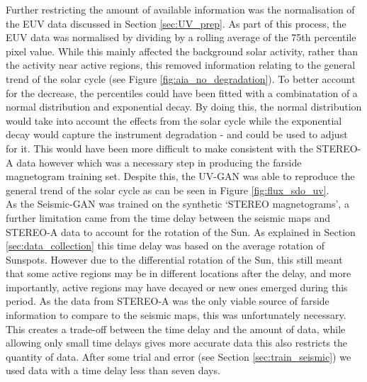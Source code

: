 \documentclass[11pt,a4paper,onecolumn]{report}
\begin{document}
Further restricting the amount of available information was the normalisation of
the EUV data discussed in Section \ref{sec:UV_prep}. As part of this process,
the EUV data was normalised by dividing by a rolling average of the 75th
percentile pixel value. While this mainly affected the background solar
activity, rather than the activity near active regions, this removed information
relating to the general trend of the solar cycle (see Figure
\ref{fig:aia_no_degradation}). To better account for the decrease, the
percentiles could have been fitted with a combinatation of a normal distribution
and exponential decay. By doing this, the normal distribution would take
into account the effects from the solar cycle while the exponential decay would
capture the instrument degradation - and could be used to adjust for it. This
would have been more difficult to make consistent with the STEREO-A data however
which was a necessary step in producing the farside magnetogram training set.
Despite this, the UV-GAN was able to reproduce the general trend of the
solar cycle as can be seen in Figure \ref{fig:flux_sdo_uv}. \\


As the Seismic-GAN was trained on the synthetic `STEREO magnetograms', a further
limitation came from the time delay between the seismic maps and STEREO-A data to
account for the rotation of the Sun. As explained in Section
\ref{sec:data_collection} this time delay was based on the average rotation of
Sunspots. However due to the differential rotation of the Sun, this still meant
that some active regions may be in different locations after the delay, and more
importantly, active regions may have decayed or new ones emerged during this
period. As the data from STEREO-A was the only viable source of farside
information to compare to the seismic maps, this was unfortunately necessary.
This creates a trade-off between the time delay and the amount of data, while
allowing only small time delays gives more accurate data this also restricts the
quantity of data. After some trial and error (see Section \ref{sec:train_seismic})
we used data with a time delay less than seven days. \\
\end{document}
